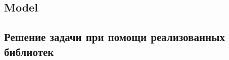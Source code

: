 \documentclass[12pt, a4paper]{article}
\begin{document}
	\subsection{Model}
	
	
	
	\subsection{Решение задачи при помощи реализованных библиотек}
	
	
	
\end{document}
